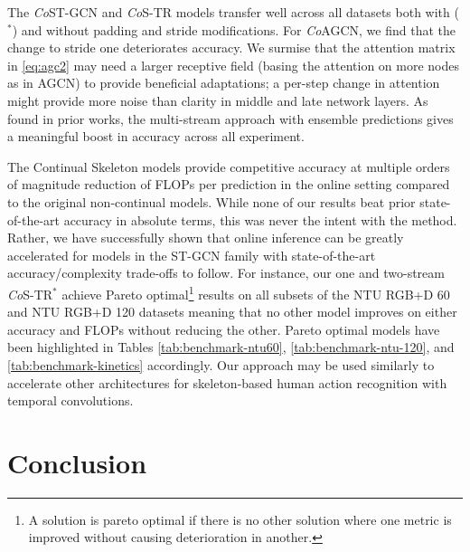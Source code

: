 \documentclass[journal]{IEEEtran}
\theoremstyle{definition}
\begin{document}
The \textit{Co}ST-GCN and \textit{Co}S-TR models transfer well across all datasets both with ($^*$) and without padding and stride modifications. For \textit{Co}AGCN, we find that the change to stride one deteriorates accuracy. We surmise that the attention matrix in \cref{eq:agc2} may need a larger receptive field (basing the attention on more nodes as in AGCN) to provide beneficial adaptations; a per-step change in attention might provide more noise than clarity in middle and late network layers.
As found in prior works, the multi-stream approach with ensemble predictions gives a meaningful boost in accuracy across all experiment. 

The Continual Skeleton models provide competitive accuracy at multiple orders of magnitude reduction of FLOPs per prediction in the online setting compared to the original non-continual models. While none of our results beat prior state-of-the-art accuracy in absolute terms, this was never the intent with the method. Rather, we have successfully shown that online inference can be greatly accelerated for models in the ST-GCN family with state-of-the-art accuracy/complexity trade-offs to follow. 
For instance, our one and two-stream \textit{Co}S-TR$^*$ achieve Pareto optimal\footnote{A solution is pareto optimal if there is no other solution where one metric is improved without causing deterioration in another.} results on all subsets of the NTU RGB+D 60 and NTU RGB+D 120 datasets meaning that no other model improves on either accuracy and FLOPs without reducing the other. Pareto optimal models have been highlighted in Tables \ref{tab:benchmark-ntu60}, \ref{tab:benchmark-ntu-120}, and \ref{tab:benchmark-kinetics} accordingly.
Our approach may be used similarly to accelerate other architectures for skeleton-based human action recognition with temporal convolutions.



\section{Conclusion} \label{sec:conclusion}
\end{document}
